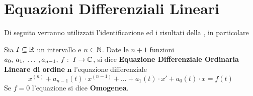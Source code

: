 \newpage
\cbstart
\section{Equazioni Differenziali Lineari}
Di seguito verranno utilizzati l'identificazione ed i risultati della , in particolare 
\begin{definition}
	Sia $I \subseteq \mathbb{R}$ un intervallo e $n \in \mathbb{N}$. Date le $n + 1$ funzioni $a_0,\:a_1,\:\dotsc\:,a_{n-1},\:f:\; I \to \mathbb{C}$, si dice \textbf{Equazione Differenziale Ordinaria Lineare di ordine} $\boldsymbol{n}$ l'equazione differenziale
	\[x^{(n)} + a_{n-1}(t) \cdot x^{(n-1)} + \dotsc + a_{1}(t) \cdot x' + a_{0}(t) \cdot x = f(t)\]
	Se $f = 0$ l'equazione si dice \textbf{Omogenea}.
\end{definition}
